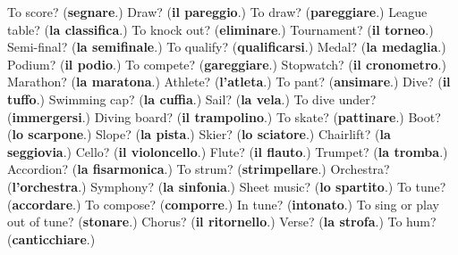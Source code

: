 \begin{tcolorbox}[breakable,colback=teal!4,colframe=teal!35!black,title={Before you move on}]
To score? (\textbf{segnare}.) Draw? (\textbf{il pareggio}.) To draw? (\textbf{pareggiare}.) League table? (\textbf{la classifica}.) To knock out? (\textbf{eliminare}.) Tournament? (\textbf{il torneo}.) Semi-final? (\textbf{la semifinale}.) To qualify? (\textbf{qualificarsi}.) Medal? (\textbf{la medaglia}.) Podium? (\textbf{il podio}.) To compete? (\textbf{gareggiare}.) Stopwatch? (\textbf{il cronometro}.) Marathon? (\textbf{la maratona}.) Athlete? (\textbf{l'atleta}.) To pant? (\textbf{ansimare}.) Dive? (\textbf{il tuffo}.) Swimming cap? (\textbf{la cuffia}.) Sail? (\textbf{la vela}.) To dive under? (\textbf{immergersi}.) Diving board? (\textbf{il trampolino}.) To skate? (\textbf{pattinare}.) Boot? (\textbf{lo scarpone}.) Slope? (\textbf{la pista}.) Skier? (\textbf{lo sciatore}.) Chairlift? (\textbf{la seggiovia}.) Cello? (\textbf{il violoncello}.) Flute? (\textbf{il flauto}.) Trumpet? (\textbf{la tromba}.) Accordion? (\textbf{la fisarmonica}.) To strum? (\textbf{strimpellare}.) Orchestra? (\textbf{l'orchestra}.) Symphony? (\textbf{la sinfonia}.) Sheet music? (\textbf{lo spartito}.) To tune? (\textbf{accordare}.) To compose? (\textbf{comporre}.) In tune? (\textbf{intonato}.) To sing or play out of tune? (\textbf{stonare}.) Chorus? (\textbf{il ritornello}.) Verse? (\textbf{la strofa}.) To hum? (\textbf{canticchiare}.)
\end{tcolorbox}
